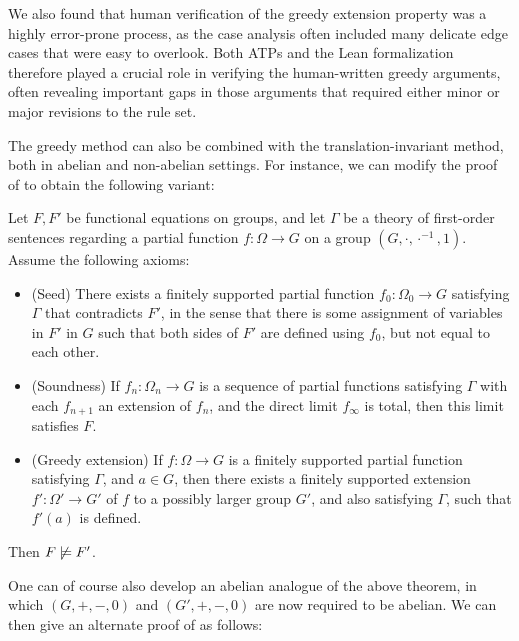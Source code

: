 We also found that human verification of the greedy extension property was a highly error-prone process, as the case analysis often included many delicate edge cases that were easy to overlook.  Both ATPs and the Lean formalization therefore played a crucial role in verifying the human-written greedy arguments, often revealing important gaps in those arguments that required either minor or major revisions to the rule set.

The greedy method can also be combined with the translation-invariant method, both in abelian and non-abelian settings. For instance, we can modify the proof of  to obtain the following variant:

\begin{theorem}\label{nc-greedy-abstract} Let $F,F'$ be functional equations on groups, and let $\Gamma$ be a theory of first-order sentences regarding a partial function $f \colon \Omega \to G$ on a group $(G,\cdot, \cdot^{-1},1)$.  Assume the following axioms:
  \setlength{\parskip}{0pt}
  \begin{itemize}
    \item[(i)] (Seed) There exists a finitely supported partial function $f_0 \colon \Omega_0 \to G$ satisfying $\Gamma$ that contradicts $F'$, in the sense that there is some assignment of variables in $F'$ in $G$ such that both sides of $F'$ are defined using $f_0$, but not equal to each other.
    \item[(ii)]  (Soundness)  If $f_n \colon \Omega_n \to G$ is a sequence of partial functions satisfying $\Gamma$ with each $f_{n+1}$ an extension of $f_n$, and the direct limit $f_\infty$ is total, then this limit satisfies $F$.
    \item[(iii)] (Greedy extension)  If $f \colon \Omega \to G$ is a finitely supported partial function satisfying $\Gamma$, and $a \in G$, then there exists a finitely supported extension $f' \colon \Omega' \to G'$ of $f$ to a possibly larger group $G'$, and also satisfying $\Gamma$, such that $f'(a)$ is defined.
  \end{itemize}
  Then $F \not\models F'$.
\end{theorem}

One can of course also develop an abelian analogue of the above theorem, in which $(G,+,-,0)$ and $(G',+,-,0)$ are now required to be abelian.  We can then give an alternate proof of  as follows:

